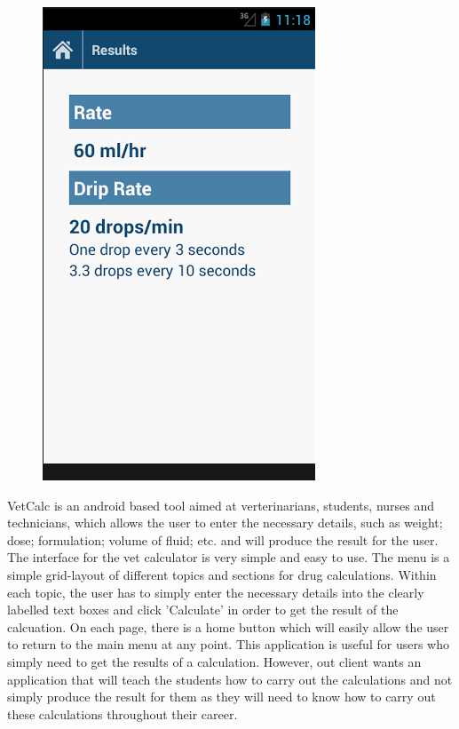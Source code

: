 \documentclass{l3proj}
\begin{document}
\begin{figure}[!htb]
  \includegraphics[width=\linewidth]{images/VetCalcApp/VetCalcApp4.png}
\endminipage
\end{figure}

VetCalc is an android based tool aimed at verterinarians, students, nurses and technicians, which allows the user to enter the necessary details, such as weight; dose; formulation; volume of fluid; etc. and will produce the result for the user. The interface for the vet calculator is very simple and easy to use. The menu is a simple grid-layout of different topics and sections for drug calculations. Within each topic, the user has to simply enter the necessary details into the clearly labelled text boxes and click 'Calculate' in order to get the result of the calcuation. On each page, there is a home button which will easily allow the user to return to the main menu at any point. This application is useful for users who simply need to get the results of a calculation. However, out client wants an application that will teach the students how to carry out the calculations and not simply produce the result for them as they will need to know how to carry out these calculations throughout their career.
\end{document}
